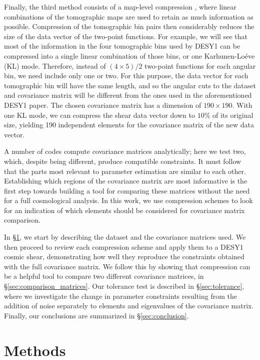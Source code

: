 \documentclass[aps, prd, twocolumn, superscriptaddress, nofootinbib, amssymb, amsmath]{revtex4-2}
\newcommand{\rsec}[1]{\S\ref{sec:#1}}
\begin{document}
Finally, the third method consists of a map-level compression \cite{Alonso:2017hhj}, where linear combinations of the tomographic maps are used to retain as much information as possible. Compression of the tomographic bin pairs then considerably reduces the size of the data vector of the two-point functions. For example, we will see that most of the information in the four tomographic bins used by DESY1 can be compressed into a single linear combination of those bins, or one Karhunen-Lo\'eve (KL) mode. Therefore, instead of $(4\times5)/2$ two-point functions for each angular bin, we need include only one or two. For this purpose, the data vector for each tomographic bin will have the same length, and so the angular cuts to the dataset and covariance matrix will be different from the ones used in the aforementioned DESY1 paper. The chosen covariance matrix has a dimension of $190 \times 190$. With one KL mode, we can compress the shear data vector down to $10\%$ of its original size, yielding 190 independent elements for the covariance matrix of the new data vector.

A number of codes compute covariance matrices analytically; here we test two, which, despite being different, produce compatible constraints. It must follow that the parts most relevant to parameter estimation are similar to each other. Establishing which regions of the covariance matrix are most informative is the first step towards building a tool for comparing these matrices without the need for a full cosmological analysis. In this work, we use compression schemes to look for an indication of which elements should be considered for covariance matrix comparison.

In \rsec{methods}, we start by describing the dataset and the covariance matrices used. We then proceed to review each compression scheme and apply them to a DESY1 cosmic shear, demonstrating how well they reproduce the constraints obtained with the full covariance matrix. We follow this by showing that compression can be a helpful tool to compare two different covariance matrices, in \rsec{comparison_matrices}. Our tolerance test is described in \rsec{tolerance}, where we investigate the change in parameter constraints resulting from the addition of noise separately to elements and eigenvalues of the covariance matrix. Finally, our conclusions are summarized in \rsec{conclusion}. 

\section{Methods}\label{sec:methods}
\end{document}
